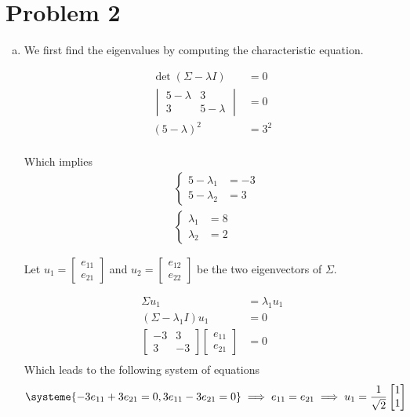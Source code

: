 \documentclass[a4paper, 12pt, twoside]{article}
\begin{document}
\section{Problem 2}

\begin{enumerate}[a)]
    \item We first find the eigenvalues by computing the characteristic equation.
    
    \begin{align*}
        \det (\Sigma - \lambda I) &= 0 \\
        \begin{vmatrix} 5 - \lambda & 3 \\ 3 & 5 - \lambda \end{vmatrix} &= 0 \\
        (5-\lambda)^2 &= 3^2 \\
    \end{align*}

    Which implies
    \begin{align*}
        &\begin{cases}
            5 - \lambda_1 &= -3 \\
            5 - \lambda_2 &= 3    
        \end{cases} \\
        &\begin{cases}
            \lambda_1 &= 8 \\
            \lambda_2 &= 2  
        \end{cases}
    \end{align*}

    Let $u_1 = \begin{bmatrix}e_{11} \\ e_{21}\end{bmatrix}$ and $u_2 = \begin{bmatrix}e_{12} \\ e_{22}\end{bmatrix}$ be the two eigenvectors of $\Sigma$.

    \begin{align*}
        \Sigma u_1 &= \lambda_1 u_1 \\
        (\Sigma - \lambda_1 I) u_1 &= 0 \\
        \begin{bmatrix}
            -3 & 3 \\
            3 & -3
        \end{bmatrix}
        \begin{bmatrix}
            e_{11} \\ e_{21}
        \end{bmatrix} &= 0 \\
    \end{align*}
    Which leads to the following system of equations
    \begin{align*}
        \systeme{
            -3 e_{11} + 3 e_{21} = 0, 
            3 e_{11} - 3 e_{21} = 0
        } 
        \implies e_{11} = e_{21} 
    \implies u_1 = \frac{1}{\sqrt{2}}\begin{bmatrix}1 \\ 1\end{bmatrix}
    \end{align*}


\end{enumerate}
\end{document}
